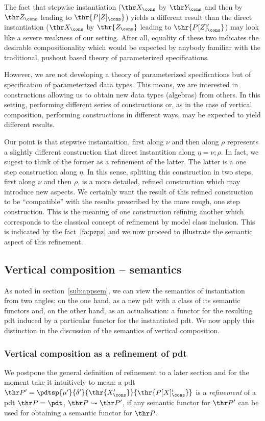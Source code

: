 The fact that stepwise instantiation ($\thr X_\cons$ by $\thr Y_\cons$ and then by
$\thr Z_\cons$ leading to $\thr{P[Z]_\cons}$) yields a different result than the direct instantiation
($\thr X_\cons$ by $\thr{Z_\cons}$ leading to $\thr{P[Z]'_\cons}$) may look like a severe weakness of our
setting. After all, equality of these two indicates the desirable
compositionality which would be expected by anybody familiar with the
traditional, pushout based theory of parameterized specifications. 

However,
we are not developing a theory of parameterized specifications but of
specification of parameterized data types. This means, we are interested in
constructions allowing us to obtain new data types (algebras) from others. In
this setting, performing different series of constructions or, as in the case
of vertical composition, performing constructions in different ways, may be
expected to yield different results. 

Our point is that stepwise instantaition, first along $\nu$ and then along
$\rho$ represents a slightly different construction that direct instantition
along $\eta=\nu;\rho$. In fact, we sugest to think of the former as a refinement
of the latter. The latter is a one step construction along $\eta$. In this
sense, splitting this construction in two steps, first along $\nu$ and then
$\rho$, is a more detailed, refined construction which may introduce new
aspects. We certainly want the result of this refined construction to be
``compatible'' with the results prescribed by the more rough, one step
construction. This is the meaning of one construction refining another which
corresponds to the classical concept of refinement by model class
inclusion. This is indicated by the fact~\ref{fa:pzpz} and we now
proceed to illustrate the semantic aspect of this refinement.

\subsection{Vertical composition -- semantics}
%
As noted in section~\ref{sub:appsem}, we can view the semantics of
instantiation from two angles: on the one hand, as a new pdt with a class of
its semantic functors and, on the other hand, as an actualisation: a functor
for the resulting pdt induced by a
particular functor for the instantiated pdt. We now apply this distinction in
the discussion of the semantics of vertical composition.
\subsubsection{Vertical composition as a refinement of pdt}\label{sub:vertref}
We postpone the general definition of refinement to a later section and for
the moment take it intuitively to mean:
a pdt $\thr P'=\pdtsp{\mu'}{\delta'}{\thr{X'_\cons}}{\thr{P[X]'_\cons}}$ is a {\em
refinement} of a pdt $\thr P=\pdt$, $\thr P\leadsto \thr P'$, if any semantic
functor for $\thr P'$ can be used for obtaining 
a semantic functor for $\thr P$.

